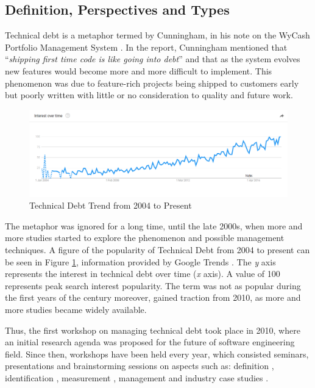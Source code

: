 \documentclass{mprop}
\begin{document}
\subsection{Definition, Perspectives and Types}
\label{section:def}

Technical debt is a metaphor termed by Cunningham, in his note on the WyCash
Portfolio Management System \cite{Cunningham1993}. In the report, Cunningham
mentioned that ``\textit{shipping first time code is like going into debt}'' and
that as the system evolves new features would become more and more difficult to
implement. This phenomenon was due to feature-rich projects being shipped to
customers early but poorly written with little or no consideration to quality
and future work.

\begin{figure}
	\centering
	\includegraphics[width=\linewidth]{visualisations/TD_trend.png}
	\caption{Technical Debt Trend from 2004 to Present}
	\label{fig:td-trend}
\end{figure}

The metaphor was ignored for a long time, until the late 2000s, when more and
more studies started to explore the phenomenon and possible management
techniques. A figure of the popularity of Technical Debt from 2004 to present
can be seen in Figure \ref{fig:td-trend}, information provided by Google Trends
\cite{GoogleTrends}. The \textit{y} axis represents the interest in technical
debt over time (\textit{x} axis). A value of 100 represents peak search interest
popularity. The term was not as popular during the first years of the century
moreover, gained traction from 2010, as more and more studies became widely
available.

Thus, the first workshop on managing technical debt took place in 2010, where an
initial research agenda was proposed for the future of software engineering
field. Since then, workshops have been held every year, which consisted
seminars, presentations and brainstorming sessions on aspects such as:
definition \cite{Kruchten2012} \cite{Theodoropoulos2011} \cite{Schmid2013},
identification \cite{Ernst2012}, measurement \cite{Letouzey2012}
\cite{Curtis2012} \cite{Nugroho2011} \cite{Zazworka2011} \cite{Fontana2012}
\cite{Bohnet2011}, management \cite{Guo2011} \cite{Zazworka2011Prioritise}
\cite{Seaman2012} and industry case studies \cite{Lim2012}
\cite{Morgenthaler2012} \cite{Codabux2013} \cite{Holvitie2014}
\cite{Klinger2011}.
\end{document}

